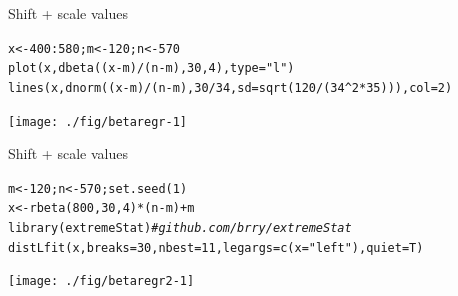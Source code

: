\documentclass[xcolor=table,           xcolor=dvipsnames]{beamer}\usepackage[]{graphicx}\usepackage[]{color}
\makeatletter
\newcommand{\hlnum}[1]{\textcolor[rgb]{0,0,0}{#1}}
\newcommand{\hlstr}[1]{\textcolor[rgb]{0.545,0.137,0.137}{#1}}
\newcommand{\hlcom}[1]{\textcolor[rgb]{0,0.392,0}{\textit{#1}}}
\newcommand{\hlopt}[1]{\textcolor[rgb]{0,0,0}{#1}}
\newcommand{\hlstd}[1]{\textcolor[rgb]{0,0,0}{#1}}
\newcommand{\hlkwb}[1]{\textcolor[rgb]{0,0,0}{#1}}
\newcommand{\hlkwc}[1]{\textcolor[rgb]{1,0,1}{#1}}
\newcommand{\hlkwd}[1]{\textcolor[rgb]{0,0,1}{#1}}
\newenvironment{kframe}{%
 \def\at@end@of@kframe{}%
 \ifinner\ifhmode%
  \def\at@end@of@kframe{\end{minipage}}%
  \begin{minipage}{\columnwidth}%
 \fi\fi%
 \def\FrameCommand##1{\hskip\@totalleftmargin \hskip-\fboxsep
 \colorbox{shadecolor}{##1}\hskip-\fboxsep
     \hskip-\linewidth \hskip-\@totalleftmargin \hskip\columnwidth}%
 \MakeFramed {\advance\hsize-\width
   \@totalleftmargin\z@ \linewidth\hsize
   \@setminipage}}%
 {\par\unskip\endMakeFramed%
 \at@end@of@kframe}
\newenvironment{knitrout}{}{} %
\makeatother
\begin{document}

\begin{frame}[fragile]{Shift + scale values}
\begin{knitrout}\small
{}\color{fgcolor}\begin{kframe}
\begin{alltt}
\hlstd{x} \hlkwb{<-} \hlnum{400}\hlopt{:}\hlnum{580}\hlstd{; m} \hlkwb{<-} \hlnum{120} \hlstd{; n} \hlkwb{<-} \hlnum{570}
\hlkwd{plot}\hlstd{(x,} \hlkwd{dbeta}\hlstd{((x}\hlopt{-}\hlstd{m)}\hlopt{/}\hlstd{(n}\hlopt{-}\hlstd{m),}\hlnum{30}\hlstd{,}\hlnum{4}\hlstd{),} \hlkwc{type}\hlstd{=}\hlstr{"l"}\hlstd{)}
\hlkwd{lines}\hlstd{(x,} \hlkwd{dnorm}\hlstd{((x}\hlopt{-}\hlstd{m)}\hlopt{/}\hlstd{(n}\hlopt{-}\hlstd{m),}\hlnum{30}\hlopt{/}\hlnum{34}\hlstd{,} \hlkwc{sd}\hlstd{=}\hlkwd{sqrt}\hlstd{(}\hlnum{120}\hlopt{/}\hlstd{(}\hlnum{34}\hlopt{^}\hlnum{2}\hlopt{*}\hlnum{35}\hlstd{))),} \hlkwc{col}\hlstd{=}\hlnum{2}\hlstd{)}
\end{alltt}
\end{kframe}

{\centering \texttt{[image: ./fig/betaregr-1]} 

}



\end{knitrout}
\end{frame}



\begin{frame}[fragile]{Shift + scale values}
\vspace{-1.5em}
\begin{knitrout}\footnotesize
{}\color{fgcolor}\begin{kframe}
\begin{alltt}
\hlstd{m} \hlkwb{<-} \hlnum{120} \hlstd{; n} \hlkwb{<-} \hlnum{570}\hlstd{;} \hlkwd{set.seed}\hlstd{(}\hlnum{1}\hlstd{)}
\hlstd{x} \hlkwb{<-} \hlkwd{rbeta}\hlstd{(}\hlnum{800}\hlstd{,}\hlnum{30}\hlstd{,}\hlnum{4}\hlstd{)} \hlopt{*} \hlstd{(n}\hlopt{-}\hlstd{m)}\hlopt{+}\hlstd{m}
\hlkwd{library}\hlstd{(extremeStat)} \hlcom{# github.com/brry/extremeStat}
\hlkwd{distLfit}\hlstd{(x,} \hlkwc{breaks}\hlstd{=}\hlnum{30}\hlstd{,} \hlkwc{nbest}\hlstd{=}\hlnum{11}\hlstd{,} \hlkwc{legargs}\hlstd{=}\hlkwd{c}\hlstd{(}\hlkwc{x}\hlstd{=}\hlstr{"left"}\hlstd{),} \hlkwc{quiet}\hlstd{=T)}
\end{alltt}
\end{kframe}

{\centering \texttt{[image: ./fig/betaregr2-1]} 

}



\end{knitrout}
\end{frame}
\end{document}
